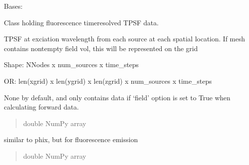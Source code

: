 \documentclass[letterpaper,10pt,english]{sphinxmanual}
\begin{document}
\begin{fulllineitems}
\label{\detokenize{_autosummary/nirfasterff.base.data.flTPSFdata:nirfasterff.base.data.flTPSFdata}}
\pysigstartsignatures
\pysigline
{}
\pysigstopsignatures
\sphinxAtStartPar
Bases: 

\sphinxAtStartPar
Class holding fluorescence time\sphinxhyphen{}resolved TPSF data.

\begin{fulllineitems}
\label{\detokenize{_autosummary/nirfasterff.base.data.flTPSFdata:nirfasterff.base.data.flTPSFdata.phix}}
\pysigstartsignatures
\pysigline
{}
\pysigstopsignatures
\sphinxAtStartPar
TPSF at exciation wavelength from each source at each spatial location. If mesh contains non\sphinxhyphen{}tempty field vol, this will be represented on the grid

\sphinxAtStartPar
Shape: NNodes x num\_sources x time\_steps

\sphinxAtStartPar
OR: len(xgrid) x len(ygrid) x len(zgrid) x num\_sources x time\_steps

\sphinxAtStartPar
None by default, and only contains data if ‘field’ option is set to True when calculating forward data.
\begin{quote}\begin{description}
\sphinxAtStartPar
double NumPy array

\end{description}\end{quote}

\end{fulllineitems}


\begin{fulllineitems}
\label{\detokenize{_autosummary/nirfasterff.base.data.flTPSFdata:nirfasterff.base.data.flTPSFdata.phifl}}
\pysigstartsignatures
\pysigline
{}
\pysigstopsignatures
\sphinxAtStartPar
similar to phix, but for fluorescence emission
\begin{quote}\begin{description}
\sphinxAtStartPar
double NumPy array


\end{description}
\end{quote}
\end{fulllineitems}
\end{fulllineitems}
\end{document}
